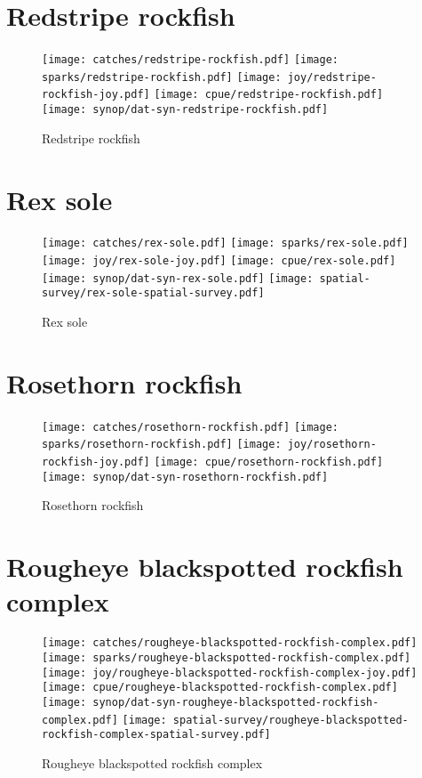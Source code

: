 \section*{Redstripe rockfish}

\begin{figure}[htbp]
\centering
\texttt{[image: catches/redstripe-rockfish.pdf]}
\texttt{[image: sparks/redstripe-rockfish.pdf]}
\texttt{[image: joy/redstripe-rockfish-joy.pdf]}
\texttt{[image: cpue/redstripe-rockfish.pdf]}
\texttt{[image: synop/dat-syn-redstripe-rockfish.pdf]}
\caption{Redstripe rockfish}
\end{figure}
\clearpage
\section*{Rex sole}

\begin{figure}[htbp]
\centering
\texttt{[image: catches/rex-sole.pdf]}
\texttt{[image: sparks/rex-sole.pdf]}
\texttt{[image: joy/rex-sole-joy.pdf]}
\texttt{[image: cpue/rex-sole.pdf]}
\texttt{[image: synop/dat-syn-rex-sole.pdf]}
\texttt{[image: spatial-survey/rex-sole-spatial-survey.pdf]}
\caption{Rex sole}
\end{figure}
\clearpage
\section*{Rosethorn rockfish}

\begin{figure}[htbp]
\centering
\texttt{[image: catches/rosethorn-rockfish.pdf]}
\texttt{[image: sparks/rosethorn-rockfish.pdf]}
\texttt{[image: joy/rosethorn-rockfish-joy.pdf]}
\texttt{[image: cpue/rosethorn-rockfish.pdf]}
\texttt{[image: synop/dat-syn-rosethorn-rockfish.pdf]}
\caption{Rosethorn rockfish}
\end{figure}
\clearpage
\section*{Rougheye blackspotted rockfish complex}

\begin{figure}[htbp]
\centering
\texttt{[image: catches/rougheye-blackspotted-rockfish-complex.pdf]}
\texttt{[image: sparks/rougheye-blackspotted-rockfish-complex.pdf]}
\texttt{[image: joy/rougheye-blackspotted-rockfish-complex-joy.pdf]}
\texttt{[image: cpue/rougheye-blackspotted-rockfish-complex.pdf]}
\texttt{[image: synop/dat-syn-rougheye-blackspotted-rockfish-complex.pdf]}
\texttt{[image: spatial-survey/rougheye-blackspotted-rockfish-complex-spatial-survey.pdf]}
\caption{Rougheye blackspotted rockfish complex}
\end{figure}
\clearpage
